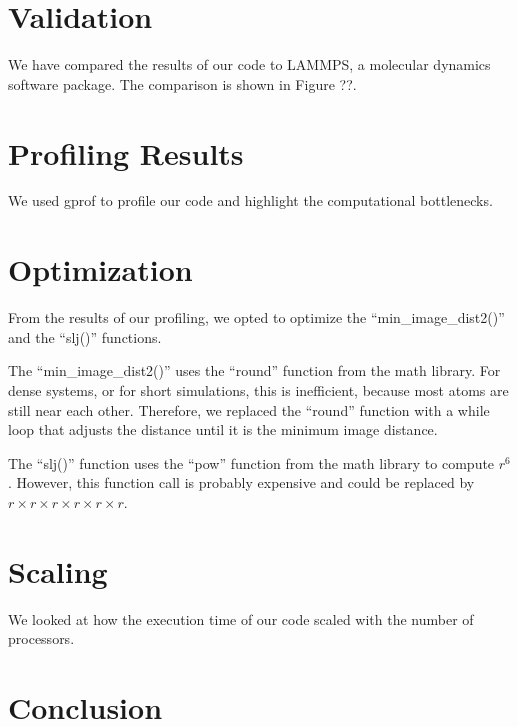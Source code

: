 \documentclass[10pt]{article}
\begin{document}
\section{Validation}
We have compared the results of our code to LAMMPS, a molecular dynamics software package.
%
The comparison is shown in Figure ??.

\section{Profiling Results}
We used gprof to profile our code and highlight the computational bottlenecks.


\section{Optimization}
From the results of our profiling, we opted to optimize the ``min\_image\_dist2()'' and the ``slj()'' functions.

The ``min\_image\_dist2()'' uses the ``round'' function from the math library. 
%
For dense systems, or for short simulations, this is inefficient, because most atoms are still near each other.
%
Therefore, we replaced the ``round'' function with a while loop that adjusts the distance until it is the minimum image distance.

The ``slj()'' function uses the ``pow'' function from the math library to compute $r^6$.
%
However, this function call is probably expensive and could be replaced by $r \times r \times r \times r \times r \times r$.
%


\section{Scaling}
We looked at how the execution time of our code scaled with the number of processors.

\section{Conclusion}
\end{document}
